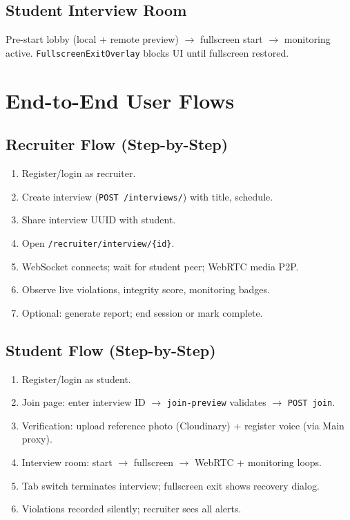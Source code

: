 \documentclass[11pt,a4paper]{report}
\begin{document}
\section{Student Interview Room}
Pre-start lobby (local + remote preview) $\rightarrow$ fullscreen start $\rightarrow$ monitoring active. \texttt{FullscreenExitOverlay} blocks UI until fullscreen restored.

\chapter{End-to-End User Flows}

\section{Recruiter Flow (Step-by-Step)}
\begin{enumerate}
  \item Register/login as recruiter.
  \item Create interview (\texttt{POST /interviews/}) with title, schedule.
  \item Share interview UUID with student.
  \item Open \texttt{/recruiter/interview/\{id\}}.
  \item WebSocket connects; wait for student peer; WebRTC media P2P.
  \item Observe live violations, integrity score, monitoring badges.
  \item Optional: generate report; end session or mark complete.
\end{enumerate}

\section{Student Flow (Step-by-Step)}
\begin{enumerate}
  \item Register/login as student.
  \item Join page: enter interview ID $\rightarrow$ \texttt{join-preview} validates $\rightarrow$ \texttt{POST join}.
  \item Verification: upload reference photo (Cloudinary) + register voice (via Main proxy).
  \item Interview room: start $\rightarrow$ fullscreen $\rightarrow$ WebRTC + monitoring loops.
  \item Tab switch terminates interview; fullscreen exit shows recovery dialog.
  \item Violations recorded silently; recruiter sees all alerts.
\end{enumerate}
\end{document}
